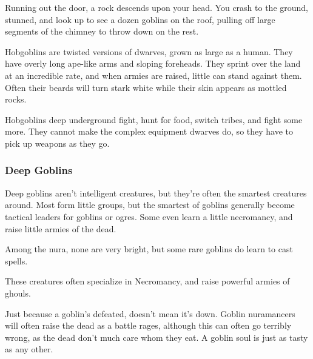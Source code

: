 \begin{multicols}{2}
\begin{boxtext}

	Running out the door, a rock descends upon your head.
	You crash to the ground, stunned, and look up to see a dozen goblins on the roof, pulling off large segments of the chimney to throw down on the rest.

\end{boxtext}

\label{hobgoblin}

Hobgoblins are twisted versions of dwarves, grown as large as a human.
They have overly long ape-like arms and sloping foreheads.
They sprint over the land at an incredible rate, and when armies are raised, little can stand against them.
Often their beards will turn stark white while their skin appears as mottled rocks.
 

\label{deep_hobgoblin}

Hobgoblins deep underground fight, hunt for food, switch tribes, and fight some more.  They cannot make the complex equipment dwarves do, so they have to pick up weapons as they go.


\subsubsection{Deep Goblins}\label{deep_goblin}

Deep goblins aren't intelligent creatures, but they're often the smartest creatures around.
Most form little groups, but the smartest of goblins generally become tactical leaders for goblins or ogres.
Some even learn a little necromancy, and raise little armies of the dead.




Among the nura, none are very bright, but some rare goblins do learn to cast spells.

These creatures often specialize in Necromancy, and raise powerful armies of ghouls.



Just because a goblin's defeated, doesn't mean it's down.
Goblin nuramancers will often raise the dead as a battle rages, although this can often go terribly wrong, as the dead don't much care whom they eat.
A goblin soul is just as tasty as any other.


\end{multicols}
